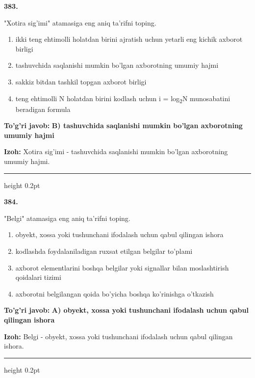 \documentclass[10pt,a4paper,oneside]{article}
\begin{document}
\noindent\textbf{\color{ink}383.}
\par
"Xotira sig'imi" atamasiga eng aniq ta'rifni toping.
\begin{enumerate}[label=\Alph*),leftmargin=9mm]
\item ikki teng ehtimolli holatdan birini ajratish uchun yetarli eng kichik axborot birligi
\item tashuvchida saqlanishi mumkin bo'lgan axborotning umumiy hajmi
\item sakkiz bitdan tashkil topgan axborot birligi
\item teng ehtimolli N holatdan birini kodlash uchun i = log\textsubscript{2}N munosabatini beradigan formula
\end{enumerate}
\begin{tcolorbox}[enhanced,breakable,colback=teal!4,colframe=teal!50!black,boxrule=0.5pt,arc=1.1mm,left=3mm,right=3mm,top=1.7mm,bottom=1.7mm,before skip=2mm,after skip=2mm]
\textbf{\color{teal}To'g'ri javob:} \textbf{B) tashuvchida saqlanishi mumkin bo'lgan axborotning umumiy hajmi}
\par\smallskip
\textbf{Izoh:} Xotira sig'imi - tashuvchida saqlanishi mumkin bo'lgan axborotning umumiy hajmi.
\end{tcolorbox}
\vspace{2mm}\hrule height 0.2pt \vspace{3mm}

\noindent\textbf{\color{ink}384.}
\par
"Belgi" atamasiga eng aniq ta'rifni toping.
\begin{enumerate}[label=\Alph*),leftmargin=9mm]
\item obyekt, xossa yoki tushunchani ifodalash uchun qabul qilingan ishora
\item kodlashda foydalaniladigan ruxsat etilgan belgilar to'plami
\item axborot elementlarini boshqa belgilar yoki signallar bilan moslashtirish qoidalari tizimi
\item axborotni belgilangan qoida bo'yicha boshqa ko'rinishga o'tkazish
\end{enumerate}
\begin{tcolorbox}[enhanced,breakable,colback=teal!4,colframe=teal!50!black,boxrule=0.5pt,arc=1.1mm,left=3mm,right=3mm,top=1.7mm,bottom=1.7mm,before skip=2mm,after skip=2mm]
\textbf{\color{teal}To'g'ri javob:} \textbf{A) obyekt, xossa yoki tushunchani ifodalash uchun qabul qilingan ishora}
\par\smallskip
\textbf{Izoh:} Belgi - obyekt, xossa yoki tushunchani ifodalash uchun qabul qilingan ishora.
\end{tcolorbox}
\vspace{2mm}\hrule height 0.2pt \vspace{3mm}
\end{document}
